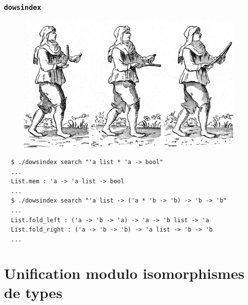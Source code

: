 \documentclass[serif]{beamer}
\newcommand{\dowsindex}{\texttt{dowsindex}\xspace}
\begin{document}
\begin{frame}[fragile=singleslide]\frametitle{\dowsindex}
\begin{figure}[h]
  \centering
  \includegraphics{images/sourcier}
\end{figure}
\footnotesize
\begin{verbatim}
  $ ./dowsindex search "'a list * 'a -> bool"
  ...
  List.mem : 'a -> 'a list -> bool
  ...
  $ ./dowsindex search "'a list -> ('a * 'b -> 'b) -> 'b -> 'b"
  ...
  List.fold_left : ('a -> 'b -> 'a) -> 'a -> 'b list -> 'a
  List.fold_right : ('a -> 'b -> 'b) -> 'a list -> 'b -> 'b
  ...
\end{verbatim}
\end{frame}


\section{Unification modulo isomorphismes de types}

%
\end{document}
